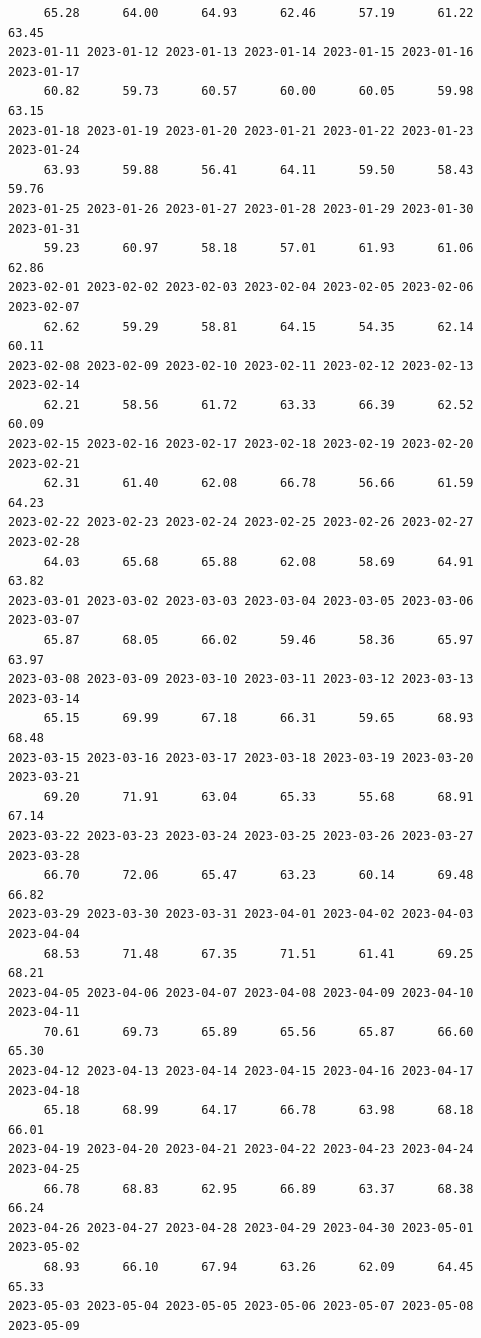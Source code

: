 \documentclass[
  letterpaper,
  DIV=11,
  numbers=noendperiod]{scrartcl}
\begin{document}
\begin{verbatim}
     65.28      64.00      64.93      62.46      57.19      61.22      63.45 
2023-01-11 2023-01-12 2023-01-13 2023-01-14 2023-01-15 2023-01-16 2023-01-17 
     60.82      59.73      60.57      60.00      60.05      59.98      63.15 
2023-01-18 2023-01-19 2023-01-20 2023-01-21 2023-01-22 2023-01-23 2023-01-24 
     63.93      59.88      56.41      64.11      59.50      58.43      59.76 
2023-01-25 2023-01-26 2023-01-27 2023-01-28 2023-01-29 2023-01-30 2023-01-31 
     59.23      60.97      58.18      57.01      61.93      61.06      62.86 
2023-02-01 2023-02-02 2023-02-03 2023-02-04 2023-02-05 2023-02-06 2023-02-07 
     62.62      59.29      58.81      64.15      54.35      62.14      60.11 
2023-02-08 2023-02-09 2023-02-10 2023-02-11 2023-02-12 2023-02-13 2023-02-14 
     62.21      58.56      61.72      63.33      66.39      62.52      60.09 
2023-02-15 2023-02-16 2023-02-17 2023-02-18 2023-02-19 2023-02-20 2023-02-21 
     62.31      61.40      62.08      66.78      56.66      61.59      64.23 
2023-02-22 2023-02-23 2023-02-24 2023-02-25 2023-02-26 2023-02-27 2023-02-28 
     64.03      65.68      65.88      62.08      58.69      64.91      63.82 
2023-03-01 2023-03-02 2023-03-03 2023-03-04 2023-03-05 2023-03-06 2023-03-07 
     65.87      68.05      66.02      59.46      58.36      65.97      63.97 
2023-03-08 2023-03-09 2023-03-10 2023-03-11 2023-03-12 2023-03-13 2023-03-14 
     65.15      69.99      67.18      66.31      59.65      68.93      68.48 
2023-03-15 2023-03-16 2023-03-17 2023-03-18 2023-03-19 2023-03-20 2023-03-21 
     69.20      71.91      63.04      65.33      55.68      68.91      67.14 
2023-03-22 2023-03-23 2023-03-24 2023-03-25 2023-03-26 2023-03-27 2023-03-28 
     66.70      72.06      65.47      63.23      60.14      69.48      66.82 
2023-03-29 2023-03-30 2023-03-31 2023-04-01 2023-04-02 2023-04-03 2023-04-04 
     68.53      71.48      67.35      71.51      61.41      69.25      68.21 
2023-04-05 2023-04-06 2023-04-07 2023-04-08 2023-04-09 2023-04-10 2023-04-11 
     70.61      69.73      65.89      65.56      65.87      66.60      65.30 
2023-04-12 2023-04-13 2023-04-14 2023-04-15 2023-04-16 2023-04-17 2023-04-18 
     65.18      68.99      64.17      66.78      63.98      68.18      66.01 
2023-04-19 2023-04-20 2023-04-21 2023-04-22 2023-04-23 2023-04-24 2023-04-25 
     66.78      68.83      62.95      66.89      63.37      68.38      66.24 
2023-04-26 2023-04-27 2023-04-28 2023-04-29 2023-04-30 2023-05-01 2023-05-02 
     68.93      66.10      67.94      63.26      62.09      64.45      65.33 
2023-05-03 2023-05-04 2023-05-05 2023-05-06 2023-05-07 2023-05-08 2023-05-09 

\end{verbatim}
\end{document}
